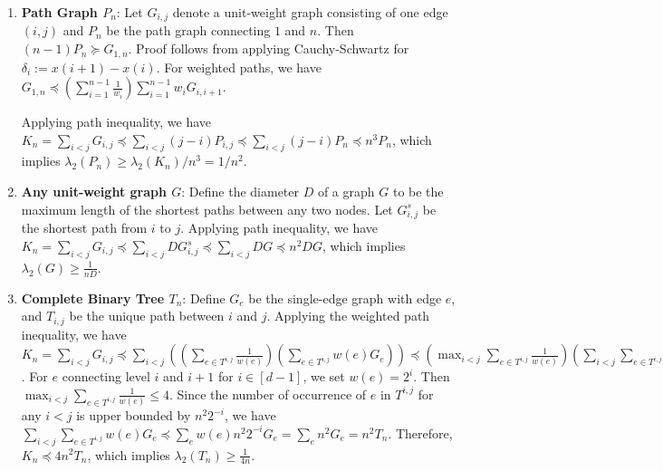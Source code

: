 \begin{enumerate}

    \item \textbf{Path Graph $P_n$}: Let $G_{i,j}$ denote a unit-weight graph consisting of one edge $(i,j)$ and $P_n$ be the path graph connecting $1$ and $n$. Then $(n-1)P_n \succeq G_{1,n}$. Proof follows from applying Cauchy-Schwartz for $\delta_i:=x(i+1)-x(i)$. For weighted paths, we have $G_{1, n} \preceq\left(\sum_{i=1}^{n-1} \frac{1}{w_{i}}\right) \sum_{i=1}^{n-1} w_{i} G_{i, i+1}$.

    Applying path inequality, we have $K_n = \sum_{i<j} G_{i,j} \preceq \sum_{i<j} (j-i) P_{i,j} \preceq \sum_{i<j} (j-i) P_n \preceq n^3 P_n$, which implies $\lambda_2(P_n) \ge \lambda_2(K_n)/n^3 = 1/n^2$.



    \item \textbf{Any unit-weight graph $G$}: Define the diameter $D$ of a graph $G$ to be the maximum length of the shortest paths between any two nodes. Let $G^s_{i,j}$ be the shortest path from $i$ to $j$. Applying path inequality, we have $K_n = \sum_{i<j} G_{i,j} \preceq \sum_{i<j} D G^s_{i,j} \preceq \sum_{i<j} DG \preceq n^2 DG$, which implies $\lambda_2(G) \ge \frac{1}{nD}$.

    \item \textbf{Complete Binary Tree $T_n$}: Define $G_e$ be the single-edge graph with edge $e$, and $T_{i,j}$ be the unique path between $i$ and $j$. Applying the weighted path inequality, we have $K_n = \sum_{i<j} G_{i,j} \preceq \sum_{i<j}\left(\left(\sum_{e \in T^{i, j}} \frac{1}{w(e)}\right)\left(\sum_{e \in T^{i, j}} w(e) G_{e}\right)\right) \preceq\left(\max _{i<j} \sum_{e \in T^{i, j}} \frac{1}{w(e)}\right)\left(\sum_{i<j} \sum_{e \in T^{i, j}} w(e) G_{e}\right)$. For $e$ connecting level $i$ and $i+1$ for $i \in [d-1]$, we set $w(e)=2^i$. Then $\max _{i<j} \sum_{e \in T^{i, j}} \frac{1}{w(e)} \le 4$. Since the number of occurrence of $e$ in $T^{i,j}$ for any $i<j$ is upper bounded by $n^2 2^{-i}$, we have $\sum_{i<j} \sum_{e \in T^{i, j}} w(e) G_{e} \preceq \sum_{e} w(e) n^2 2^{-i} G_e = \sum_e n^2 G_e = n^2T_n$. Therefore, $K_n \preceq 4n^2T_n$, which implies $\lambda_2(T_n) \ge \frac{1}{4n}$.
    

\end{enumerate}


